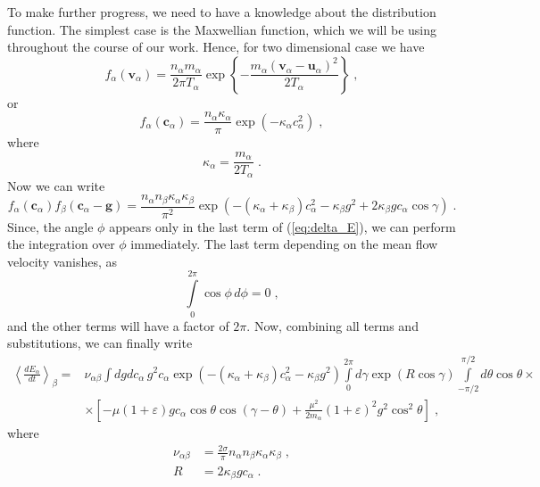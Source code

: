 \documentclass[preprint, aps, pra]{revtex4-1}
\newcommand{\ab}{{\alpha\beta}}
\newcommand{\eps}{\varepsilon}
\newcommand{\bv}{{\bm{v}}}
\newcommand{\bu}{{\bm{u}}}
\newcommand{\bc}{{\bm{c}}}
\newcommand{\bg}{{\bm{g}}}
\newcommand{\kp}{\kappa}
\begin{document}
To make further progress, we need to have a knowledge about the distribution function. The simplest case is the Maxwellian function, which
we will be using throughout the course of our work. Hence, for two dimensional case we have
\begin{equation}
  f_\alpha(\bv_\alpha)=\frac{n_\alpha m_\alpha}{2\pi T_\alpha}\exp\left\{-\frac{m_\alpha(\bv_\alpha-\bu_\alpha)^2}{2T_\alpha}\right\}\;,
\end{equation}
or 
\begin{equation}
  f_\alpha(\bc_\alpha)=\frac{n_\alpha\kp_\alpha}{\pi}\exp\left(-\kp_\alpha c_\alpha^2\right)\;,
\end{equation}
where
\begin{equation}
  \kp_\alpha = \frac{m_\alpha}{2T_\alpha}\;.
\end{equation}
Now we can write
\begin{equation}
  f_\alpha(\bc_\alpha)f_\beta(\bc_\alpha-\bg)=\frac{n_\alpha n_\beta\kp_\alpha\kp_\beta}{\pi^2}
  \exp\left(-(\kp_\alpha+\kp_\beta)c_\alpha^2-\kp_\beta g^2+2\kp_\beta g c_\alpha\cos\gamma\right)\;.
\end{equation}
Since, the angle $\phi$ appears only in the last term of (\ref{eq:delta_E}), we can perform the integration over $\phi$ immediately.
The last term depending on the mean flow velocity vanishes, as 
\begin{equation}
  \int\limits_0^{2\pi}\cos\phi\,d\phi=0\;,
\end{equation}
and the other terms will have a factor of $2\pi$. Now, combining all terms and substitutions, we can finally write
\begin{equation}
  \begin{split}
    \left\langle\frac{dE_\alpha}{dt}\right\rangle_\beta = &\nu_\ab\int dg dc_\alpha\,g^2c_\alpha
    \exp(-(\kp_\alpha+\kp_\beta)c_\alpha^2-\kp_\beta g^2)\int\limits_0^{2\pi}d\gamma\exp(R\cos\gamma)\int\limits_{-\pi/2}^{\pi/2}d\theta\cos\theta\times\\
    &\times\left[-\mu(1+\eps)gc_\alpha\cos\theta\cos(\gamma-\theta)+\frac{\mu^2}{2m_\alpha}(1+\eps)^2g^2\cos^2\theta\right]\;,
  \end{split}
\end{equation}
where
\begin{equation}
  \begin{split}
    \nu_\ab &= \frac{2\sigma}{\pi}n_\alpha n_\beta\kp_\alpha\kp_\beta\;,\\
    R &= 2\kp_\beta gc_\alpha\;.
  \end{split}
\end{equation}
\end{document}
